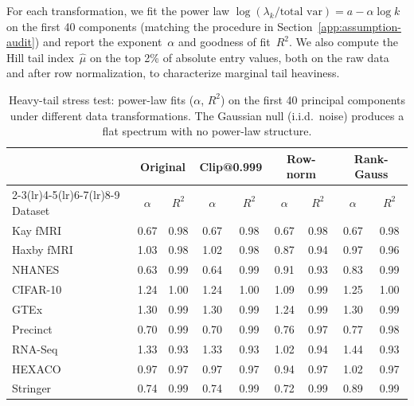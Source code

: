 For each transformation, we fit the power law $\log(\lambda_k/\text{total var})
= a - \alpha\log k$ on the first 40 components (matching the procedure in
Section~\ref{app:assumption-audit}) and report the exponent~$\alpha$ and
goodness of fit~$R^2$.
We also compute the Hill tail index~$\hat\mu$ on the top 2\% of absolute entry
values, both on the raw data and after row normalization, to characterize
marginal tail heaviness.

\begin{table}[h]
\centering
\caption{Heavy-tail stress test: power-law fits ($\alpha$, $R^2$) on the first 40
principal components under different data transformations.
The Gaussian null (i.i.d.\ noise) produces a flat spectrum with no power-law structure.}
\label{tab:heavy-tail}
\small
\begin{tabular}{lcc cc cc cc}
\toprule
& \multicolumn{2}{c}{Original} & \multicolumn{2}{c}{Clip@0.999}
& \multicolumn{2}{c}{Row-norm} & \multicolumn{2}{c}{Rank-Gauss} \\
\cmidrule(lr){2-3}\cmidrule(lr){4-5}\cmidrule(lr){6-7}\cmidrule(lr){8-9}
Dataset & $\alpha$ & $R^2$ & $\alpha$ & $R^2$ & $\alpha$ & $R^2$ & $\alpha$ & $R^2$ \\
\midrule
Kay fMRI    & 0.67 & 0.98 & 0.67 & 0.98 & 0.67 & 0.98 & 0.67 & 0.98 \\
Haxby fMRI  & 1.03 & 0.98 & 1.02 & 0.98 & 0.87 & 0.94 & 0.97 & 0.96 \\
NHANES      & 0.63 & 0.99 & 0.64 & 0.99 & 0.91 & 0.93 & 0.83 & 0.99 \\
CIFAR-10    & 1.24 & 1.00 & 1.24 & 1.00 & 1.09 & 0.99 & 1.25 & 1.00 \\
GTEx        & 1.30 & 0.99 & 1.30 & 0.99 & 1.24 & 0.99 & 1.30 & 0.99 \\
Precinct    & 0.70 & 0.99 & 0.70 & 0.99 & 0.76 & 0.97 & 0.77 & 0.98 \\
RNA-Seq     & 1.33 & 0.93 & 1.33 & 0.93 & 1.02 & 0.94 & 1.44 & 0.93 \\
HEXACO      & 0.97 & 0.97 & 0.97 & 0.97 & 0.94 & 0.97 & 1.02 & 0.97 \\
Stringer    & 0.74 & 0.99 & 0.74 & 0.99 & 0.72 & 0.99 & 0.89 & 0.99 \\
\bottomrule
\end{tabular}
\end{table}

